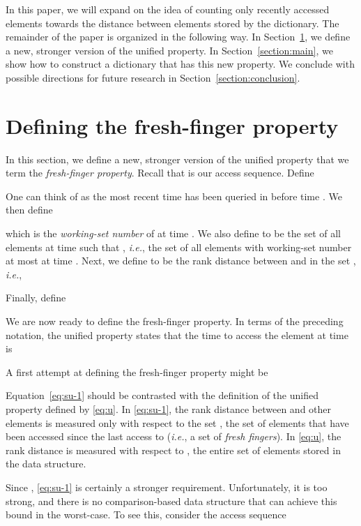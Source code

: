 \documentclass{llncs}
\newcommand{\ie}{\textsl{i.e.}}
\begin{document}
In this paper, we will expand on the idea of counting only recently accessed elements towards the distance between elements stored by the dictionary. The remainder of the paper is organized in the following way. In Section~\ref{section:definitions}, we define a new, stronger version of the unified property. In Section~\ref{section:main}, we show how to construct a dictionary that has this new property. We conclude with possible directions for future research in Section~\ref{section:conclusion}.

\section{Defining the fresh-finger property}
\label{section:definitions}

In this section, we define a new, stronger version of the unified property that we term the \emph{fresh-finger property}. Recall that  is our access sequence. Define


One can think of  as the most recent time  has been queried in  before time . We then define

which is the \emph{working-set number} of  at time . We also define  to be the set of all elements  at time  such that , \ie, the set of all elements with working-set number at most  at time .  Next, we define  to be the rank distance between  and  in the set , \ie,

Finally, define


We are now ready to define the fresh-finger property. In terms of the preceding notation, the unified property states that the time to access the element  at time  is 

A first attempt at defining the fresh-finger property might be 

Equation~\eqref{eq:su-1} should be contrasted with the definition of the unified property defined by \eqref{eq:u}.  In \eqref{eq:su-1}, the rank distance between  and other elements is measured only with respect to the set , the set of elements that have been accessed since the last access to  (\ie, a set of \emph{fresh fingers}).  In \eqref{eq:u}, the rank distance is measured with respect to , the entire set of elements stored in the data structure.

Since , \eqref{eq:su-1} is certainly a stronger requirement.  Unfortunately, it is too strong, and there is no comparison-based data structure that can achieve this bound in the worst-case. To see this, consider the access sequence
\end{document}
